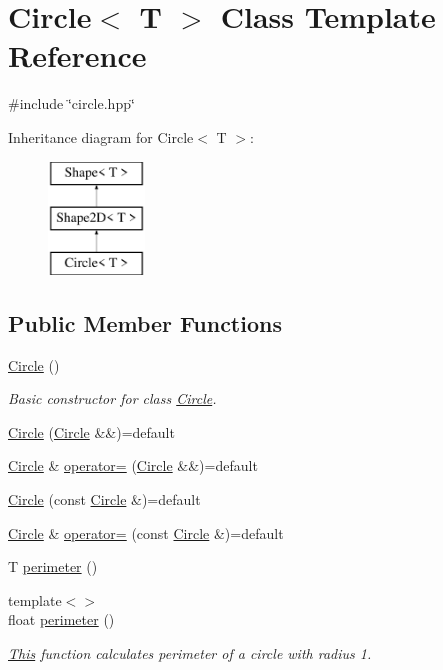\hypertarget{classCircle}{}\section{Circle$<$ T $>$ Class Template Reference}
\label{classCircle}


{\ttfamily \#include \char`\"{}circle.\+hpp\char`\"{}}

Inheritance diagram for Circle$<$ T $>$\+:\begin{figure}[H]
\begin{center}
\leavevmode
\includegraphics[height=3.000000cm]{classCircle}
\end{center}
\end{figure}
\subsection*{Public Member Functions}
\begin{DoxyCompactItemize}
\item 
\mbox{\hyperlink{classCircle_a0a298ea0e982a94a60091aeb2767f6e4}{Circle}} ()
\begin{DoxyCompactList}\small\item\em Basic constructor for class \mbox{\hyperlink{classCircle}{Circle}}. \end{DoxyCompactList}\item 
\mbox{\hyperlink{classCircle_ad4ee8eadfd4201a937af204ac4e6ec37}{Circle}} (\mbox{\hyperlink{classCircle}{Circle}} \&\&)=default
\item 
\mbox{\hyperlink{classCircle}{Circle}} \& \mbox{\hyperlink{classCircle_a06c8a2624fa51b38023e0326e8ccf789}{operator=}} (\mbox{\hyperlink{classCircle}{Circle}} \&\&)=default
\item 
\mbox{\hyperlink{classCircle_a163162aa8beaceb25ebd9a17966f4bd5}{Circle}} (const \mbox{\hyperlink{classCircle}{Circle}} \&)=default
\item 
\mbox{\hyperlink{classCircle}{Circle}} \& \mbox{\hyperlink{classCircle_a0e3ef62951a8fccaf0635ea21ae73eca}{operator=}} (const \mbox{\hyperlink{classCircle}{Circle}} \&)=default
\item 
T \mbox{\hyperlink{classCircle_a6f066fc39c0de339b0498b04a56be028}{perimeter}} ()
\item 
{\footnotesize template$<$$>$ }\\float \mbox{\hyperlink{classCircle_aa6c86a4a5d3ee7eb598879ba856430d9}{perimeter}} ()
\begin{DoxyCompactList}\small\item\em \mbox{\hyperlink{classThis}{This}} function calculates perimeter of a circle with radius 1. \end{DoxyCompactList}\end{DoxyCompactItemize}
